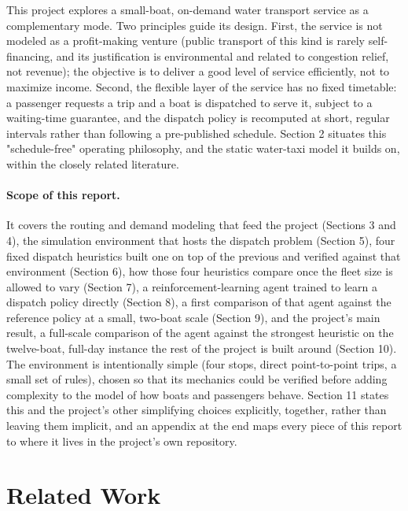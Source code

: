 \documentclass[11pt,a4paper]{article}
\begin{document}
This project explores a small-boat, on-demand water transport service as a complementary mode. Two principles guide its design. First, the service is not modeled as a profit-making venture (public transport of this kind is rarely self-financing, and its justification is environmental and related to congestion relief, not revenue); the objective is to deliver a good level of service efficiently, not to maximize income. Second, the flexible layer of the service has no fixed timetable: a passenger requests a trip and a boat is dispatched to serve it, subject to a waiting-time guarantee, and the dispatch policy is recomputed at short, regular intervals rather than following a pre-published schedule. Section 2 situates this "schedule-free" operating philosophy, and the static water-taxi model it builds on, within the closely related literature.

\paragraph{Scope of this report.} It covers the routing and demand modeling that feed the project (Sections 3 and 4), the simulation environment that hosts the dispatch problem (Section 5), four fixed dispatch heuristics built one on top of the previous and verified against that environment (Section 6), how those four heuristics compare once the fleet size is allowed to vary (Section 7), a reinforcement-learning agent trained to learn a dispatch policy directly (Section 8), a first comparison of that agent against the reference policy at a small, two-boat scale (Section 9), and the project's main result, a full-scale comparison of the agent against the strongest heuristic on the twelve-boat, full-day instance the rest of the project is built around (Section 10). The environment is intentionally simple (four stops, direct point-to-point trips, a small set of rules), chosen so that its mechanics could be verified before adding complexity to the model of how boats and passengers behave. Section 11 states this and the project's other simplifying choices explicitly, together, rather than leaving them implicit, and an appendix at the end maps every piece of this report to where it lives in the project's own repository.

\section{Related Work}
\end{document}

